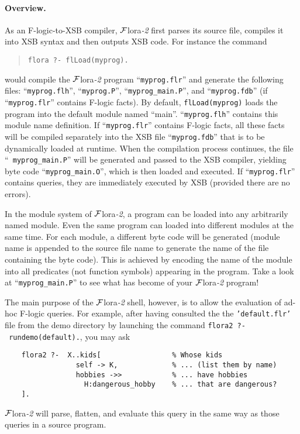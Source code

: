\documentclass[11pt]{article}
\newcommand{\FLORA}{{\mbox{${\cal F}${\sc lora}\rm\emph{-2}}}\xspace}
\newcommand{\fl}{\mbox{F-logic}\xspace}
\begin{document}
\paragraph{Overview.}

As an \fl-to-XSB compiler, \FLORA first parses its source file,
compiles it into XSB syntax and then outputs XSB code. For instance the command
\begin{quote}
\verb|flora ?- flLoad(myprog).|
\end{quote}
would compile the \FLORA program ``{\tt myprog.flr}'' and generate the
following files: ``{\tt myprog.flh}'', ``{\tt myprog.P}'',
``{\tt myprog\_main.P}'', and ``{\tt myprog.fdb}'' (if ``{\tt myprog.flr}''
contains \fl facts).  By default, {\tt flLoad(myprog)} loads the
program into the default module named ``main''. ``{\tt myprog.flh}''
contains this module name definition.  If ``{\tt myprog.flr}''
contains \fl facts, all these facts will be compiled separately into
the XSB file ``{\tt myprog.fdb}'' that is to be dynamically loaded at
runtime. When the compilation process continues, the file ``{\tt
myprog\_main.P}'' will be generated and passed to the XSB compiler,
yielding byte code ``{\tt myprog\_main.O}'', which is then loaded and
executed.  If ``{\tt myprog.flr}'' contains queries, they are
immediately executed by XSB (provided there are no errors).

In the module system of \FLORA, a program can be loaded into any
arbitrarily named module. Even the same program can loaded into
different modules at the same time. For each module, a different byte
code will be generated (module name is appended to the source file
name to generate the name of the file containing the byte code). This
is achieved by encoding the name of the module into all predicates
(not function symbols) appearing in the program. Take a look at
``{\tt myprog\_main.P}'' to see what has become of your \FLORA program!

The main purpose of the \FLORA shell, however, is to allow the evaluation
of ad-hoc \fl queries. For example, after having consulted the
the \texttt{'default.flr'} file from the demo directory by launching
the command \texttt{flora2~?-~rundemo(default).}, you may ask
\begin{verbatim}
    flora2 ?-  X..kids[                 % Whose kids
                 self -> K,             % ... (list them by name)
                 hobbies ->>            % ... have hobbies
                   H:dangerous_hobby    % ... that are dangerous?
    ]. 
\end{verbatim}
\FLORA will parse, flatten, and evaluate this query in the same way as
those queries in a source program.
\end{document}
